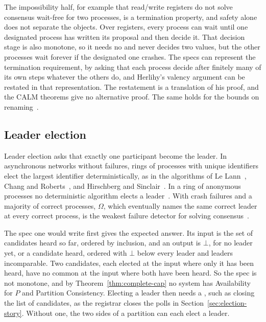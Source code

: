 The impossibility half, for example that read/write registers do not solve
consensus wait-free for two processes, is a termination property, and safety
alone does not separate the objects.  Over registers, every process can wait
until one designated process has written its proposal and then decide it.
That decision stage is also monotone, so it needs no \commitment and never
decides two values, but the other processes wait forever if the designated
one crashes.  The specs can represent the termination requirement, by asking
that each process decide after finitely many of its own steps whatever the
others do, and Herlihy's valency argument can be restated in that
representation.  The restatement is a translation of his proof, and the CALM
theorems give no alternative proof.  The same holds for the bounds on
renaming~\cite{attiya1990renaming,herlihy1999topological}.

\subsection{Leader election}
\label{app:leader}

Leader election asks that exactly one participant become the leader.  In
asynchronous networks without failures, rings of processes with unique
identifiers elect the largest identifier deterministically, as in the
algorithms of Le Lann~\cite{lelann1977distributed}, Chang and
Roberts~\cite{chang1979improved}, and Hirschberg and
Sinclair~\cite{hirschberg1980decentralized}.  In a ring of anonymous
processes no deterministic algorithm elects a leader~\cite{angluin1980local}.
With crash failures and a majority of correct processes, $\Omega$, which
eventually names the same correct leader at every correct process, is the
weakest failure detector for solving consensus~\cite{chandra1996weakest}.

The spec one would write first gives the expected answer.  Its input is the
set of candidates heard so far, ordered by inclusion, and an output is $\bot$,
for no leader yet, or a candidate heard, ordered with $\bot$ below every
leader and leaders incomparable.  Two candidates, each elected at the input
where only it has been heard, have no common \outnoun at the input where both
have been heard.  So the spec is not monotone, and by
Theorem~\ref{thm:complete-cap} no system has Availability for $P$ and
Partition Consistency.  Electing a leader then needs a \commitment, such as
closing the list of candidates, as the registrar closes the polls in
Section~\ref{sec:election-story}.  Without one, the two sides of a partition
can each elect a leader.


